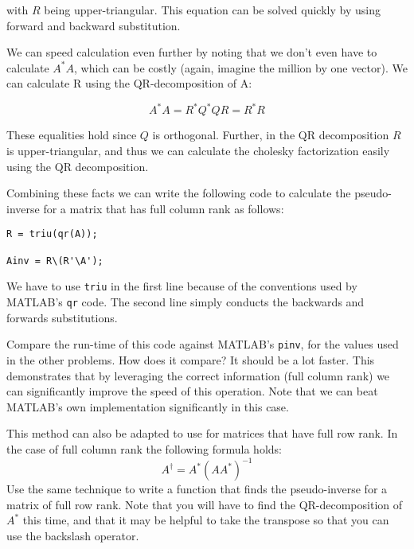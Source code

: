 with $R$ being upper-triangular. This equation can be solved quickly by using forward and backward substitution.

We can speed calculation even further by noting that we don't even have to calculate $A^* A$, which can be costly (again, imagine the million by one vector). We can calculate R using the QR-decomposition of A:

\[
A^* A = R^*Q^*QR = R^* R
\]

These equalities hold since $Q$ is orthogonal. Further, in the QR decomposition $R$ is upper-triangular, and thus we can calculate the cholesky factorization easily using the QR decomposition.

Combining these facts we can write the following code to calculate the pseudo-inverse for a matrix that has full column rank as follows:

\begin{verbatim}
R = triu(qr(A));

Ainv = R\(R'\A');
\end{verbatim}

We have to use {\tt triu} in the first line because of the conventions used by MATLAB's {\tt qr} code. The second line simply conducts the backwards and forwards substitutions.

\begin{problem}

Compare the run-time of this code against MATLAB's {\tt pinv}, for the values used in the other problems. How does it compare? It should be a lot faster. This demonstrates that by leveraging the correct information (full column rank) we can significantly improve the speed of this operation. Note that we can beat MATLAB's own implementation significantly in this case.

\end{problem}

\begin{problem}
This method can also be adapted to use for matrices that have full row rank. In the case of full column rank the following formula holds:
\[
A^\dagger = A^*(A A^*)^{-1}
\]
Use the same technique to write a function that finds the pseudo-inverse for a matrix of full row rank. Note that you will have to find the QR-decomposition of $A^*$ this time, and that it may be helpful to take the transpose so that you can use the backslash operator.
\end{problem}
